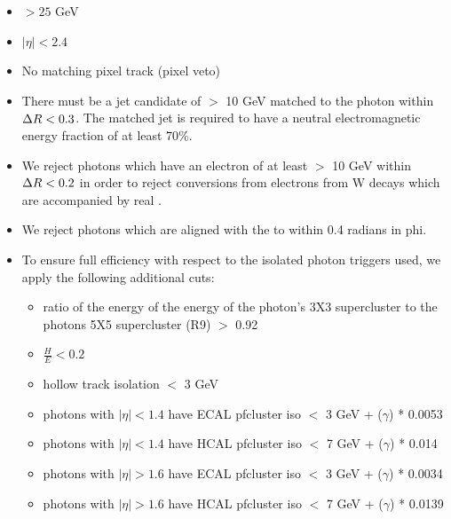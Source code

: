     \begin{itemize}
      \item \pt $ > 25$ GeV
      \item $|\eta| < 2.4$
      \item No matching pixel track (pixel veto)
      \item There must be a jet candidate of \pt $ >$ 10 GeV matched to the photon within $\Delta R < 0.3$. 
      The matched jet is required to have a neutral electromagnetic energy fraction of at least 70\%.

      \item We reject photons which have an electron of at least \pt $>$ 10 GeV within $\Delta R < 0.2$
      in order to reject conversions from electrons from W decays which are accompanied by real \MET.

      \item We reject photons which are aligned with the \MET to within 0.4 radians in phi.
      \item To ensure full efficiency with respect to the isolated photon triggers used, we apply the following additional cuts:
      \begin{itemize}
        \item ratio of the energy of the energy of the photon's 3X3 supercluster to the photons 5X5 supercluster (R9) $>$ 0.92
        \item $\frac{H}{E} < 0.2$ %
        \item hollow track isolation $<$ 3 GeV
        \item photons with $|\eta| < 1.4$ have ECAL pfcluster iso $<$ 3 GeV + \pt ($\gamma$) * 0.0053
        \item photons with $|\eta| < 1.4$ have HCAL pfcluster iso $<$ 7 GeV + \pt ($\gamma$) * 0.014
        \item photons with $|\eta| > 1.6$ have ECAL pfcluster iso $<$ 3 GeV + \pt ($\gamma$) * 0.0034
        \item photons with $|\eta| > 1.6$ have HCAL pfcluster iso $<$ 7 GeV + \pt ($\gamma$) * 0.0139
      \end{itemize}
    \end{itemize}



